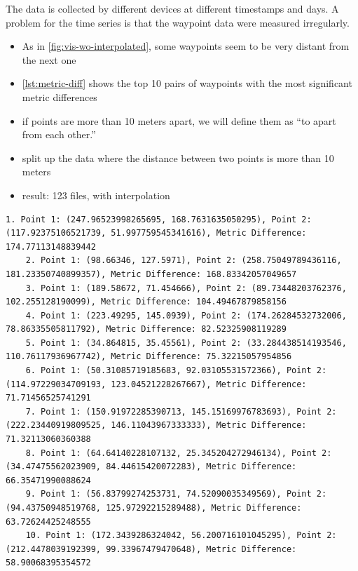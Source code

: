 The data is collected by different devices at different timestamps and days.
A problem for the time series is that the waypoint data were measured irregularly.
\begin{itemize}
    \item As in \cref{fig:vis-wo-interpolated}, some waypoints seem to be very distant from the next one
    \item \cref{lst:metric-diff} shows the top 10 pairs of waypoints with the most significant metric differences
    \item if points are more than 10 meters apart, we will define them as ``to apart from each other.''
    \item split up the data where the distance between two points is more than 10 meters
    \item result: 123 files, with interpolation
\end{itemize}


\begin{lstlisting}[caption={Top 10 pairs with the most significant metric differences},label={lst:metric-diff},captionpos=b]
    1. Point 1: (247.96523998265695, 168.7631635050295), Point 2: (117.92375106521739, 51.997759545341616), Metric Difference: 174.77113148839442
    2. Point 1: (98.66346, 127.5971), Point 2: (258.75049789436116, 181.23350740899357), Metric Difference: 168.83342057049657
    3. Point 1: (189.58672, 71.454666), Point 2: (89.73448203762376, 102.255128190099), Metric Difference: 104.49467879858156
    4. Point 1: (223.49295, 145.0939), Point 2: (174.26284532732006, 78.86335505811792), Metric Difference: 82.52325908119289
    5. Point 1: (34.864815, 35.45561), Point 2: (33.284438514193546, 110.76117936967742), Metric Difference: 75.32215057954856
    6. Point 1: (50.31085719185683, 92.03105531572366), Point 2: (114.97229034709193, 123.04521228267667), Metric Difference: 71.71456525741291
    7. Point 1: (150.91972285390713, 145.15169976783693), Point 2: (222.23440919809525, 146.11043967333333), Metric Difference: 71.32113060360388
    8. Point 1: (64.64140228107132, 25.345204272946134), Point 2: (34.47475562023909, 84.44615420072283), Metric Difference: 66.35471990088624
    9. Point 1: (56.83799274253731, 74.52090035349569), Point 2: (94.43750948519768, 125.97292215289488), Metric Difference: 63.72624425248555
    10. Point 1: (172.3439286324042, 56.200716101045295), Point 2: (212.4478039192399, 99.33967479470648), Metric Difference: 58.90068395354572
\end{lstlisting}

